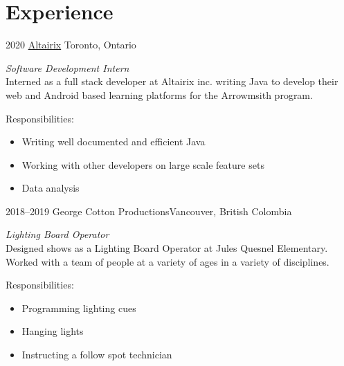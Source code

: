 \documentclass[]{style}
\begin{document}

\section{Experience}

\begin{entrylist}


\entry
{2020}
{\href{https://www.altairix.com/}{Altairix}}
{Toronto, Ontario}
{\emph{Software Development Intern} \\
Interned as a full stack developer at Altairix inc. writing Java to develop their web and Android based learning platforms for the Arrowmsith program.

Responsibilities:

\begin{itemize}
	\item Writing well documented and efficient Java
	\item Working with other developers on large scale feature sets
	\item Data analysis
\end{itemize}}


\entry
{2018–2019}
{George Cotton Productions}{Vancouver, British Colombia}
{\emph{Lighting Board Operator} \\
Designed shows as a Lighting Board Operator at Jules Quesnel Elementary. Worked with a team of people at a variety of ages in a variety of disciplines.

Responsibilities:

\begin{itemize}
	\item Programming lighting cues
	\item Hanging lights
	\item Instructing a follow spot technician
\end{itemize}}


\end{entrylist}


\end{document}
